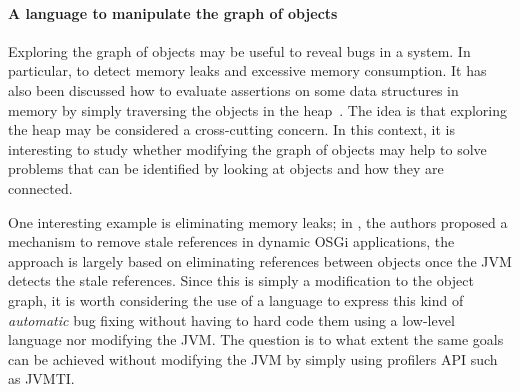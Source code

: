 

\paragraph{A language to manipulate the graph of objects}
Exploring the graph of objects may be useful to reveal bugs in a system.
In particular, to detect memory leaks and excessive memory consumption.
It has also been discussed how to evaluate assertions on some data structures in memory by simply traversing the objects in the heap~\cite{Reichenbach:2010:GCE:1869459.1869482}.
The idea is that exploring the heap may be considered a cross-cutting concern.
In this context, it is interesting to study whether modifying the graph of objects may help to solve problems that can be identified by looking at objects and how they are connected.

One interesting example is eliminating memory leaks; in \cite{dsn:15:attouchi:incinerator}, the authors proposed a mechanism to remove stale references in dynamic OSGi applications, the approach is largely based on eliminating references between objects once the JVM detects the stale references.
Since this is simply a modification to the object graph, it is worth considering the use of a language to express this kind of \textit{automatic}
bug fixing without having to hard code them using a low-level language nor modifying the JVM.
The question is to what extent the same goals can be achieved without modifying the JVM by simply using profilers API such as JVMTI.


